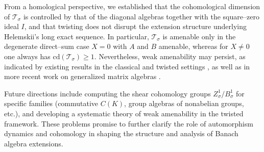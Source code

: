 \documentclass{article}
\theoremstyle{plain}
\theoremstyle{definition}
\newcommand{\T}{\mathcal{T}}
\begin{document}
From a homological perspective, we established that the cohomological dimension 
of \(\T_\sigma\) is controlled by that of the diagonal algebras together with the 
square--zero ideal $I$, and that twisting does not disrupt the extension 
structure underlying Helemskii’s long exact sequence. In particular, 
\(\T_\sigma\) is amenable only in the degenerate direct--sum case \(X=0\) with 
$A$ and $B$ amenable, whereas for \(X\neq 0\) one always has 
\(\mathrm{cd}(\T_\sigma)\ge 1\). Nevertheless, weak amenability may persist, as 
indicated by existing results in the classical \cite{ForrestMarcouxWA,MoslehianTriangular}
and twisted settings \cite{BehnamianMahmoodi2020}, as well as in more recent work on 
generalized matrix algebras \cite{Monfared2008,EsslamzadehShojaee2011,NasrIsfahani2013}. 

Future directions include computing the shear cohomology groups 
\(Z^1_\sigma/B^1_\sigma\) for specific families (commutative $C(K)$, group 
algebras of nonabelian groups, etc.), and developing a systematic theory of weak 
amenability in the twisted framework. These problems promise to further clarify 
the role of automorphism dynamics and cohomology in shaping the structure and 
analysis of Banach algebra extensions.
\end{document}
